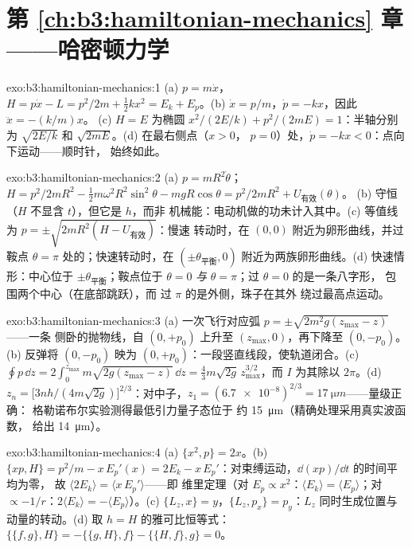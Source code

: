 \section*{第 \ref{ch:b3:hamiltonian-mechanics} 章——哈密顿力学}

\begin{solution}{exo:b3:hamiltonian-mechanics:1}
(a) $p = m\dot x$，$H = p\dot x - L = p^2/2m + \tfrac12 kx^2 = E_k +
E_p$。(b) $\dot x = p/m$，$\dot p = -kx$，因此 $\ddot x = -(k/m)x$。
(c) $H = E$ 为椭圆 $x^2/(2E/k) + p^2/(2mE) = 1$：半轴分别为
$\sqrt{2E/k}$ 和 $\sqrt{2mE}$。(d) 在最右侧点（$x > 0$，
$p = 0$）处，$\dot p = -kx < 0$：点向下运动——顺时针，
始终如此。
\end{solution}

\begin{solution}{exo:b3:hamiltonian-mechanics:2}
(a) $p = mR^2\dot\theta$；$H = p^2/2mR^2 - \tfrac12 m\omega^2R^2
\sin^2\theta - mgR\cos\theta = p^2/2mR^2 + U_{\text{有效}}(\theta)$。
(b) 守恒（$H$ 不显含 $t$），但它是 $h$，而非
机械能：电动机做的功未计入其中。(c) 等值线
为 $p = \pm\sqrt{2mR^2(H - U_{\text{有效}})}$：慢速
转动时，在 $(0, 0)$ 附近为卵形曲线，并过
鞍点 $\theta = \pi$ 处的；快速转动时，在
$(\pm\theta_{\text{平衡}}, 0)$ 附近为两族卵形曲线。(d) 快速情形：中心位于
$\pm\theta_{\text{平衡}}$；鞍点位于 $\theta = 0$ \emph{与} $\theta =
\pi$；过 $\theta = 0$ 的是一条八字形，
包围两个中心（在底部跳跃），而
过 $\pi$ 的是外侧，珠子在其外
绕过最高点运动。
\end{solution}

\begin{solution}{exo:b3:hamiltonian-mechanics:3}
(a) 一次飞行对应弧 $p = \pm\sqrt{2m^2g(z_{\max} - z)}$——一条
侧卧的抛物线，自 $(0, +p_0)$ 上升至
$(z_{\max}, 0)$，再下降至 $(0, -p_0)$。(b) 反弹将
$(0, -p_0)$ 映为 $(0, +p_0)$：一段竖直线段，使轨道闭合。(c)
$\oint p\,\dd z = 2\int_0^{z_{\max}}m\sqrt{2g(z_{\max} - z)}\,\dd z =
\tfrac43 m\sqrt{2g}\,z_{\max}^{3/2}$，而 $I$ 为其除以 $2\pi$。(d)
$z_n = \big[3nh/(4m\sqrt{2g})\big]^{2/3}$：对中子，$z_1 =
(\num{6.7e-8})^{2/3} = \qty{17}{\micro m}$——量级正确：
格勒诺布尔实验测得最低引力量子态位于
约 \qty{15}{\micro m}（精确处理采用真实波函数，
给出 \qty{14}{\micro m}）。
\end{solution}

\begin{solution}{exo:b3:hamiltonian-mechanics:4}
(a) $\{x^2, p\} = 2x$。(b) $\{xp, H\} = p^2/m - x\,E_p'(x) = 2E_k -
x\,E_p'$：对束缚运动，$\dd(xp)/\dd t$ 的时间平均为零，
故 $\langle 2E_k\rangle = \langle x\,E_p'\rangle$——即
维里定理（对 $E_p \propto x^2$：$\langle E_k\rangle = \langle
E_p\rangle$；对 $\propto -1/r$：$2\langle E_k\rangle = -\langle
E_p\rangle$）。(c) $\{L_z, x\} = y$，$\{L_z, p_x\} = p_y$：$L_z$
同时生成位置与动量的转动。(d) 取 $h
= H$ 的雅可比恒等式：$\{\{f, g\}, H\} = -\{\{g, H\}, f\} - \{\{H, f\}, g\} = 0$。
\end{solution}

